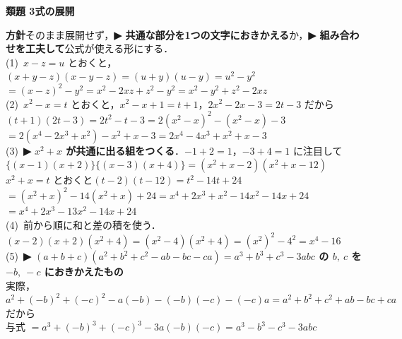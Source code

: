 \documentclass[a4paper,11pt]{ltjsarticle}
\newcommand{\ans}[2]{\Needspace{5\baselineskip}\vspace{6pt}%
  {\sffamily\bfseries 類題 #1\quad #2}\par}
\newcommand{\point}[1]{\textsf{\bfseries ▶ #1}}
\begin{document}
\ans{3}{式の展開}
\begin{kai}
\textbf{方針}\quad そのまま展開せず，\point{共通な部分を1つの文字におきかえる}か，\point{組み合わせを工夫して}公式が使える形にする．\\[2pt]
(1)\ $x-z=u$ とおくと，$(x+y-z)(x-y-z)=(u+y)(u-y)=u^2-y^2$\\
\hspace*{1.5em}$=(x-z)^2-y^2=x^2-2xz+z^2-y^2=x^2-y^2+z^2-2xz$\\[2pt]
(2)\ $x^2-x=t$ とおくと，$x^2-x+1=t+1$，$2x^2-2x-3=2t-3$ だから\\
\hspace*{1.5em}$(t+1)(2t-3)=2t^2-t-3=2(x^2-x)^2-(x^2-x)-3$\\
\hspace*{1.5em}$=2(x^4-2x^3+x^2)-x^2+x-3=2x^4-4x^3+x^2+x-3$\\[2pt]
(3)\ \point{$x^2+x$ が共通に出る組をつくる}．$-1+2=1$，$-3+4=1$ に注目して\\
\hspace*{1.5em}$\{(x-1)(x+2)\}\{(x-3)(x+4)\}=(x^2+x-2)(x^2+x-12)$\\
\hspace*{1.5em}$x^2+x=t$ とおくと\quad $(t-2)(t-12)=t^2-14t+24$\\
\hspace*{1.5em}$=(x^2+x)^2-14(x^2+x)+24=x^4+2x^3+x^2-14x^2-14x+24$\\
\hspace*{1.5em}$=x^4+2x^3-13x^2-14x+24$\\[2pt]
(4)\ 前から順に和と差の積を使う．\\
\hspace*{1.5em}$(x-2)(x+2)(x^2+4)=(x^2-4)(x^2+4)=(x^2)^2-4^2=x^4-16$\\[2pt]
(5)\ \point{$(a+b+c)(a^2+b^2+c^2-ab-bc-ca)=a^3+b^3+c^3-3abc$ の $b,\ c$ を $-b,\ -c$ におきかえたもの}\\
\hspace*{1.5em}実際，$a^2+(-b)^2+(-c)^2-a(-b)-(-b)(-c)-(-c)a=a^2+b^2+c^2+ab-bc+ca$ だから\\
\hspace*{1.5em}与式 $=a^3+(-b)^3+(-c)^3-3a(-b)(-c)=a^3-b^3-c^3-3abc$
\end{kai}
\end{document}
